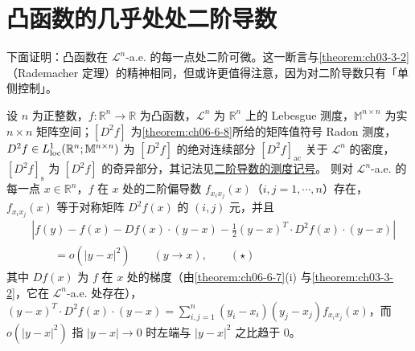 \documentclass[../../main.tex]{subfiles}%
\begin{document}
\section{凸函数的几乎处处二阶导数}\label{section:ch06-04}

下面证明：凸函数在 $\mathcal{L}^{n}$-a.e. 的每一点处二阶可微。这一断言与\cref{theorem:ch03-3-2}（Rademacher 定理）的精神相同，但或许更值得注意，因为对二阶导数只有「单侧控制」。%

\begin{theorem}[Aleksandrov 定理]\label{theorem:ch06-6-9}
设 $n$ 为正整数，$f:\mathbb{R}^{n}\to\mathbb{R}$ 为凸函数，$\mathcal{L}^{n}$ 为 $\mathbb{R}^{n}$ 上的 Lebesgue 测度，$\mathbb{M}^{n\times n}$ 为实 $n\times n$ 矩阵空间；$[D^{2}f]$ 为\cref{theorem:ch06-6-8}所给的矩阵值符号 Radon 测度，$D^{2}f\in L^{1}_{\mathrm{loc}}(\mathbb{R}^{n};\mathbb{M}^{n\times n})$ 为 $[D^{2}f]$ 的绝对连续部分 $[D^{2}f]_{\mathrm{ac}}$ 关于 $\mathcal{L}^{n}$ 的密度，$[D^{2}f]_{\mathrm{s}}$ 为 $[D^{2}f]$ 的奇异部分，其记法见\hyperref[definition:ch06-def-6-8-记号]{二阶导数的测度记号}。%
则对 $\mathcal{L}^{n}$-a.e. 的每一点 $x\in\mathbb{R}^{n}$，$f$ 在 $x$ 处的二阶偏导数 $f_{x_{i}x_{j}}(x)$（$i,j=1,\cdots,n$）存在，$f_{x_{i}x_{j}}(x)$ 等于对称矩阵 $D^{2}f(x)$ 的 $(i,j)$ 元，并且
\begin{align*}
&\left|f(y)-f(x)-Df(x)\cdot(y-x)-\frac{1}{2}(y-x)^{T}\cdot D^{2}f(x)\cdot(y-x)\right|\\
&\qquad=o(\lvert y-x\rvert^{2})\qquad(y\to x),\qquad(\star)
\end{align*}
其中 $Df(x)$ 为 $f$ 在 $x$ 处的梯度（由\cref{theorem:ch06-6-7}(i) 与\cref{theorem:ch03-3-2}，它在 $\mathcal{L}^{n}$-a.e. 处存在），$(y-x)^{T}\cdot D^{2}f(x)\cdot(y-x)=\sum_{i,j=1}^{n}(y_{i}-x_{i})(y_{j}-x_{j})f_{x_{i}x_{j}}(x)$，而 $o(\lvert y-x\rvert^{2})$ 指 $\lvert y-x\rvert\to0$ 时左端与 $\lvert y-x\rvert^{2}$ 之比趋于 $0$。%
\end{theorem}
\end{document}
